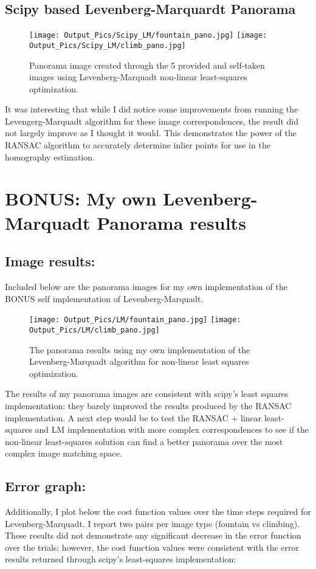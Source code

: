 \documentclass{article}
\begin{document}
\subsection{Scipy based Levenberg-Marquardt Panorama}
\begin{figure}[H]
    \centering
    \texttt{[image: Output\_Pics/Scipy\_LM/fountain\_pano.jpg]}
    \texttt{[image: Output\_Pics/Scipy\_LM/climb\_pano.jpg]}
    \caption{Panorama image created through the 5 provided and self-taken images using Levenberg-Marquadt non-linear least-squares optimization.}
\end{figure}
It was interesting that while I did notice some improvements from running the Levengerg-Marquadt algorithm for these image correspondences, the result did not largely improve as I thought it would. This demonstrates the power of the RANSAC algorithm to accurately determine inlier points for use in the homography estimation.

\section{BONUS: My own Levenberg-Marquadt Panorama results}
\subsection{Image results:}
Included below are the panorama images for my own implementation of the BONUS self implementation of Levenberg-Marquadt.
\begin{figure}[H]
    \centering
    \texttt{[image: Output\_Pics/LM/fountain\_pano.jpg]}
    \texttt{[image: Output\_Pics/LM/climb\_pano.jpg]}
    \caption{The panorama results using my own implementation of the Levenberg-Marquadt algorithm for non-linear least squares optimization.}
\end{figure}

The results of my panorama images are consistent with scipy's least squares implementation: they barely improved the results produced by the RANSAC implementation. A next step would be to test the RANSAC + linear least-squares and LM implementation with more complex correspondences to see if the non-linear least-squares solution can find a better panorama over the most complex image matching space.

\subsection{Error graph:}
Additionally, I plot below the cost function values over the time steps required for Levenberg-Marquadt. I report two pairs per image type (fountain vs climbing). These results did not demonstrate any significant decrease in the error function over the trials; however, the cost function values were consistent with the error results returned through scipy's least-squares implementation:
\end{document}
